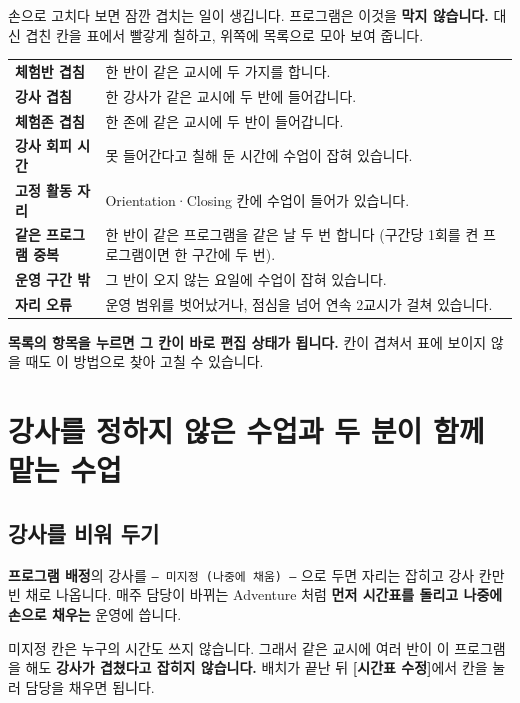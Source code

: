 \documentclass[11pt,a4paper]{article}
\newcommand{\btn}[1]{\textcolor{ttdark}{\sffamily\bfseries[#1]}}   %
\newcommand{\tab}[1]{\textcolor{ttblue}{\sffamily\bfseries#1}}      %
\newcommand{\field}[1]{\textsf{#1}}                                 %
\newcommand{\code}[1]{\texttt{\small #1}}
\begin{document}
손으로 고치다 보면 잠깐 겹치는 일이 생깁니다. 프로그램은 이것을 \textbf{막지 않습니다.}
대신 겹친 칸을 표에서 빨갛게 칠하고, 위쪽에 목록으로 모아 보여 줍니다.

\begin{center}
\begin{tabularx}{\linewidth}{@{}>{\sffamily\bfseries\color{ttdark}}l X@{}}
\toprule
체험반 겹침 & 한 반이 같은 교시에 두 가지를 합니다. \\
강사 겹침 & 한 강사가 같은 교시에 두 반에 들어갑니다. \\
체험존 겹침 & 한 존에 같은 교시에 두 반이 들어갑니다. \\
강사 회피 시간 & 못 들어간다고 칠해 둔 시간에 수업이 잡혀 있습니다. \\
고정 활동 자리 & Orientation·Closing 칸에 수업이 들어가 있습니다. \\
같은 프로그램 중복 & 한 반이 같은 프로그램을 같은 날 두 번 합니다
(\field{구간당 1회}를 켠 프로그램이면 한 구간에 두 번). \\
운영 구간 밖 & 그 반이 오지 않는 요일에 수업이 잡혀 있습니다. \\
자리 오류 & 운영 범위를 벗어났거나, 점심을 넘어 연속 2교시가 걸쳐 있습니다. \\
\bottomrule
\end{tabularx}
\end{center}

\begin{tip}
\textbf{목록의 항목을 누르면 그 칸이 바로 편집 상태가 됩니다.}
칸이 겹쳐서 표에 보이지 않을 때도 이 방법으로 찾아 고칠 수 있습니다.
\end{tip}

\section{강사를 정하지 않은 수업과 두 분이 함께 맡는 수업}\label{sec:coteach}

\subsection{강사를 비워 두기}

\tab{프로그램 배정}의 \field{강사}를 \code{--- 미지정 (나중에 채움) ---} 으로 두면
자리는 잡히고 강사 칸만 빈 채로 나옵니다. 매주 담당이 바뀌는 Adventure 처럼
\textbf{먼저 시간표를 돌리고 나중에 손으로 채우는} 운영에 씁니다.

\begin{tip}
미지정 칸은 누구의 시간도 쓰지 않습니다. 그래서 같은 교시에 여러 반이 이 프로그램을 해도
\textbf{강사가 겹쳤다고 잡히지 않습니다.} 배치가 끝난 뒤 \btn{시간표 수정}에서
칸을 눌러 담당을 채우면 됩니다.
\end{tip}
\end{document}
